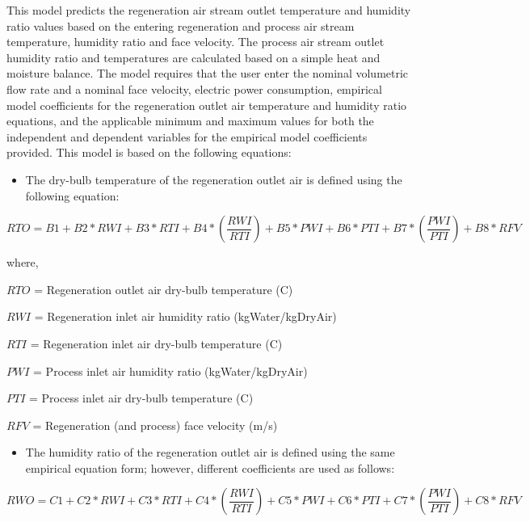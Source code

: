 This model predicts the regeneration air stream outlet temperature and humidity ratio values based on the entering regeneration and process air stream temperature, humidity ratio and face velocity. The process air stream outlet humidity ratio and temperatures are calculated based on a simple heat and moisture balance. The model requires that the user enter the nominal volumetric flow rate and a nominal face velocity, electric power consumption, empirical model coefficients for the regeneration outlet air temperature and humidity ratio equations, and the applicable minimum and maximum values for both the independent and dependent variables for the empirical model coefficients provided. This model is based on the following equations:

\begin{itemize}
\tightlist
\item
  The dry-bulb temperature of the regeneration outlet air is defined using the following equation:
\end{itemize}

\begin{equation}
RTO = B1 + B2*RWI + B3*RTI + B4*\left( {\frac{{RWI}}{{RTI}}} \right) + B5*PWI + B6*PTI + B7*\left( {\frac{{PWI}}{{PTI}}} \right) + B8*RFV
\end{equation}

where,

\(RTO\) = Regeneration outlet air dry-bulb temperature (C)

\(RWI\) = Regeneration inlet air humidity ratio (kgWater/kgDryAir)

\(RTI\) = Regeneration inlet air dry-bulb temperature (C)

\(PWI\) = Process inlet air humidity ratio (kgWater/kgDryAir)

\(PTI\) = Process inlet air dry-bulb temperature (C)

\(RFV\) = Regeneration (and process) face velocity (m/s)

\begin{itemize}
\tightlist
\item
  The humidity ratio of the regeneration outlet air is defined using the same empirical equation form; however, different coefficients are used as follows:
\end{itemize}

\begin{equation}
RWO = C1 + C2*RWI + C3*RTI + C4*\left( {\frac{{RWI}}{{RTI}}} \right) + C5*PWI + C6*PTI + C7*\left( {\frac{{PWI}}{{PTI}}} \right) + C8*RFV
\end{equation}

